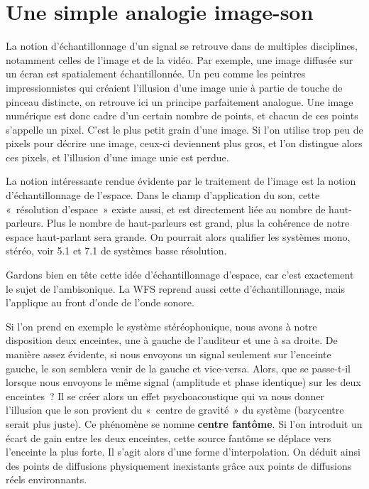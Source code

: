 \documentclass[
  letterpaper,
  DIV=11,
  numbers=noendperiod]{scrreprt}
\begin{document}
\hypertarget{une-simple-analogie-image-son}{%
\section{Une simple analogie
image-son}\label{une-simple-analogie-image-son}}

La notion d'échantillonnage d'un signal se retrouve dans de multiples
disciplines, notamment celles de l'image et de la vidéo. Par exemple,
une image diffusée sur un écran est spatialement échantillonnée. Un peu
comme les peintres impressionnistes qui créaient l'illusion d'une image
unie à partie de touche de pinceau distincte, on retrouve ici un
principe parfaitement analogue. Une image numérique est donc cadre d'un
certain nombre de points, et chacun de ces points s'appelle un pixel.
C'est le plus petit grain d'une image. Si l'on utilise trop peu de
pixels pour décrire une image, ceux-ci deviennent plus gros, et l'on
distingue alors ces pixels, et l'illusion d'une image unie est perdue.

La notion intéressante rendue évidente par le traitement de l'image est
la notion d'échantillonnage de l'espace. Dans le champ d'application du
son, cette «~résolution d'espace~» existe aussi, et est directement liée
au nombre de haut-parleurs. Plus le nombre de haut-parleurs est grand,
plus la cohérence de notre espace haut-parlant sera grande. On pourrait
alors qualifier les systèmes mono, stéréo, voir 5.1 et 7.1 de systèmes
basse résolution.

\begin{tcolorbox}[enhanced jigsaw, leftrule=.75mm, arc=.35mm, bottomtitle=1mm, colback=white, colbacktitle=quarto-callout-note-color!10!white, opacityback=0, left=2mm, rightrule=.15mm, opacitybacktitle=0.6, breakable, toptitle=1mm, titlerule=0mm, bottomrule=.15mm, toprule=.15mm, coltitle=black, title=\textcolor{quarto-callout-note-color}{\faInfo}\hspace{0.5em}{Note}]

Gardons bien en tête cette idée d'échantillonnage d'espace, car c'est
exactement le sujet de l'ambisonique. La WFS reprend aussi cette
d'échantillonnage, mais l'applique au front d'onde de l'onde sonore.

\end{tcolorbox}

Si l'on prend en exemple le système stéréophonique, nous avons à notre
disposition deux enceintes, une à gauche de l'auditeur et une à sa
droite. De manière assez évidente, si nous envoyons un signal seulement
sur l'enceinte gauche, le son semblera venir de la gauche et vice-versa.
Alors, que se passe-t-il lorsque nous envoyons le même signal (amplitude
et phase identique) sur les deux enceintes~? Il se créer alors un effet
psychoacoustique qui va nous donner l'illusion que le son provient du
«~centre de gravité~» du système (barycentre serait plus juste). Ce
phénomène se nomme \textbf{centre fantôme}. Si l'on introduit un écart
de gain entre les deux enceintes, cette source fantôme se déplace vers
l'enceinte la plus forte. Il s'agit alors d'une forme d'interpolation.
On déduit ainsi des points de diffusions physiquement inexistants grâce
aux points de diffusions réels environnants.
\end{document}
